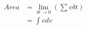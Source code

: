\documentclass[preview]{standalone}
\begin{document}
\begin{align*}
Area&=\lim_{\delta t\to 0} (\sum v \delta t) \\ &=\int v dv
\end{align*}
\end{document}
